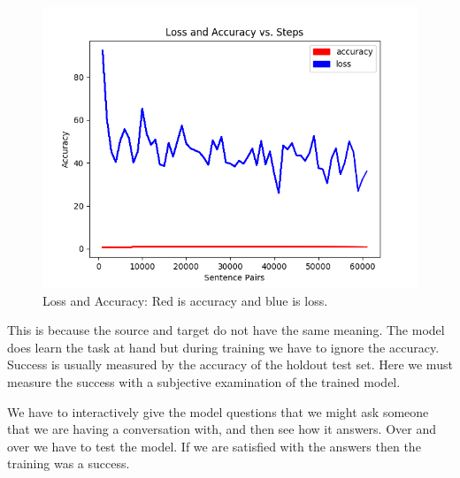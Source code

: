 \begin{figure}[H]
	\begin{center}
	
	\includegraphics[scale=0.5]{Figure_1}
		
\end{center}
	\caption[Loss and Accuracy]{Loss and Accuracy: Red is accuracy and blue is loss.}
	

\end{figure}

This is because the source and target do not have the same meaning. The model does learn the task at hand but during training we have to ignore the accuracy. Success is usually measured by the accuracy of the holdout test set. Here we must measure the success with a subjective examination of the trained model.

We have to interactively give the model questions that we might ask someone that we are having a conversation with, and then see how it answers. Over and over we have to test the model. If we are satisfied with the answers then the training was a success.